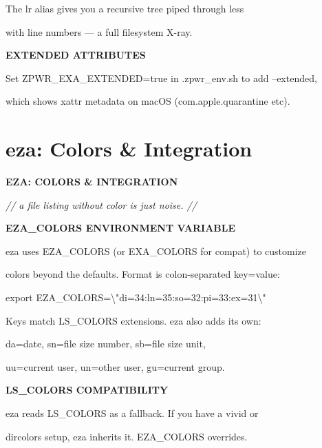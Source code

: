 \documentclass[11pt,a4paper,twoside]{book}
\begin{document}
The lr alias gives you a recursive tree piped through less

with line numbers — a full filesystem X-ray.


\vspace{12pt}
{\bfseries\color{neonyellow} EXTENDED ATTRIBUTES}\vspace{4pt}

\begin{codebox}
Set ZPWR\_EXA\_EXTENDED=true in .zpwr\_env.sh to add --extended,\\
\end{codebox}

which shows xattr metadata on macOS (com.apple.quarantine etc).


\vspace{16pt}

\section{eza: Colors \& Integration}


\vspace{10pt}
{\large\bfseries\color{neoncyan} EZA: COLORS \& INTEGRATION}\vspace{6pt}

{\small\itshape\color{dimtext} // a file listing without color is just noise. //}


\vspace{12pt}
{\bfseries\color{neonyellow} EZA\_COLORS ENVIRONMENT VARIABLE}\vspace{4pt}

eza uses EZA\_COLORS (or EXA\_COLORS for compat) to customize

colors beyond the defaults. Format is colon-separated key=value:

export EZA\_COLORS=\textbackslash{}"di=34:ln=35:so=32:pi=33:ex=31\textbackslash{}"

Keys match LS\_COLORS extensions. eza also adds its own:

da=date, sn=file size number, sb=file size unit,

uu=current user, un=other user, gu=current group.


\vspace{12pt}
{\bfseries\color{neonyellow} LS\_COLORS COMPATIBILITY}\vspace{4pt}

eza reads LS\_COLORS as a fallback. If you have a vivid or

dircolors setup, eza inherits it. EZA\_COLORS overrides.
\end{document}
